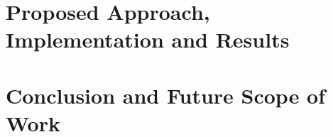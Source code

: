 \documentclass[12pt]{report}
\begin{document}
\chapter{Proposed Approach, Implementation and Results}





\chapter{Conclusion and Future Scope of Work}


\onehalfspacing
{}


\end{document}
